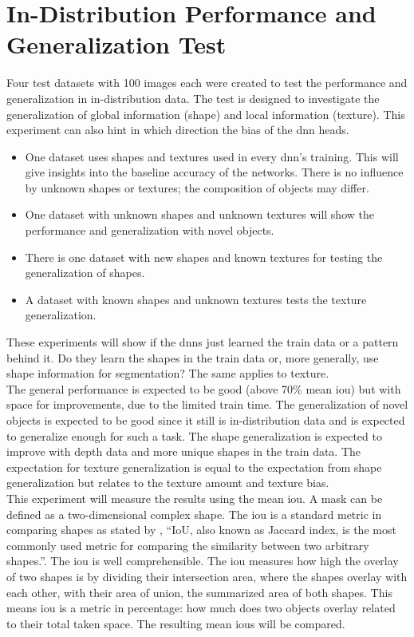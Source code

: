 	\section{In-Distribution Performance and Generalization Test}
	\label{sec:in-distribution-performance-generalization}
		Four test datasets with 100 images each were created to test the performance and generalization in in-distribution data. The test is designed to investigate the generalization of global information (shape) and local information (texture). This experiment can also hint in which direction the bias of the \ac{dnn} heads.
		\begin{itemize}
			\item One dataset uses shapes and textures used in every \ac{dnn}'s training. This will give insights into the baseline accuracy of the networks. There is no influence by unknown shapes or textures; the composition of objects may differ.
			\item One dataset with unknown shapes and unknown textures will show the performance and generalization with novel objects.
			\item There is one dataset with new shapes and known textures for testing the generalization of shapes. 
			\item A dataset with known shapes and unknown textures tests the texture generalization.
		\end{itemize}
		These experiments will show if the \ac{dnn}s just learned the train data or a pattern behind it. Do they learn the shapes in the train data or, more generally, use shape information for segmentation? The same applies to texture.\\
		The general performance is expected to be good (above 70\% mean \ac{iou}) but with space for improvements, due to the limited train time. The generalization of novel objects is expected to be good since it still is in-distribution data and is expected to generalize enough for such a task. The shape generalization is expected to improve with depth data and more unique shapes in the train data. The expectation for texture generalization is equal to the expectation from shape generalization but relates to the texture amount and texture bias.\\
		This experiment will measure the results using the mean \acl{iou}. A mask can be defined as a two-dimensional complex shape. The \ac{iou} is a standard metric in comparing shapes as stated by \textcite{Rezatofighi2019}, \enquote{IoU, also known as Jaccard index, is the most commonly used metric for comparing the similarity between two arbitrary shapes.}. The \ac{iou} is well comprehensible. The \ac{iou} measures how high the overlay of two shapes is by dividing their intersection area, where the shapes overlay with each other, with their area of union, the summarized area of both shapes. This means \ac{iou} is a metric in percentage: how much does two objects overlay related to their total taken space. The resulting mean \ac{iou}s will be compared.

